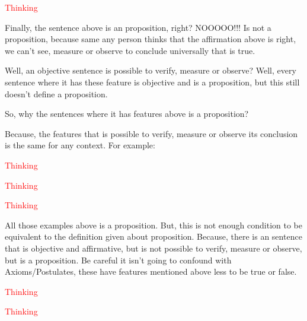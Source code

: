 \begin{example}[\textcolor{red}{A sentence that is subjective and everyone agree (this is very difficult)}]
    \textcolor{red}{Thinking}
\end{example}

Finally, the sentence above is an proposition, right? NOOOOO!!! Is not a proposition, because same any person thinks that the affirmation above is right, we can't see, measure or observe to conclude universally that is true.

Well, an objective sentence is possible to verify, measure or observe? Well, every sentence where it has these feature is objective and is a proposition, but this still doesn't define a proposition.

So, why the sentences where it has features above is a proposition?

Because, the features that is possible to verify, measure or observe its conclusion is the same for any context. For example:

\begin{example}
    \textcolor{red}{Thinking}
\end{example}

\begin{example}
    \textcolor{red}{Thinking}
\end{example}

\begin{example}
    \textcolor{red}{Thinking}
\end{example}

All those examples above is a proposition. But, this is not enough condition to be equivalent to the definition given about proposition. Because, there is an sentence that is objective and affirmative, but is not possible to verify, measure or observe, but is a proposition. Be careful it isn't going to confound with Axioms/Postulates, these have features mentioned above less to be true or false.

\begin{example}
    \textcolor{red}{Thinking}
\end{example}

\begin{example}
    \textcolor{red}{Thinking}
\end{example}

